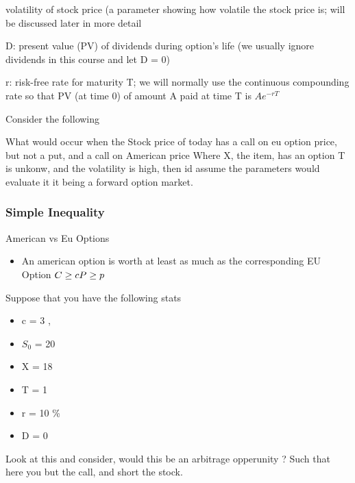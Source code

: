 \documentclass{article}
\theoremstyle{mytheoremstyle}
\theoremstyle{mytheoremstyle}
\theoremstyle{myproblemstyle}
\begin{document}
\begin{definition}[σ]
	volatility of stock price (a parameter showing how
	volatile the stock price is; will be discussed later in more
	detail
\end{definition}

\begin{definition}[D]
	D: present value (PV) of dividends during option’s life (we
	usually ignore dividends in this course and let D = 0)
\end{definition}

\begin{definition}[r]
	r: risk-free rate for maturity T; we will normally use the
	continuous compounding rate so that PV (at time 0) of
	amount A paid at time T is $Ae^{-rT}$

\end{definition}

Consider the following

What would occur when the Stock price of today has a call on eu option price, but not a put, and a call on American price
Where X, the item, has an option
T is unkonw, and the volatility is high, then id assume the parameters would evaluate it it being a forward option market.

\subsubsection{Simple Inequality}
American vs Eu Options

\begin{itemize}
	\item An american option is worth at least as much as the corresponding EU Option
	      \begin{math}
		      C \ge c
		      \\
		      P \ge p
	      \end{math}

\end{itemize}

Suppose that you have the following stats
\begin{itemize}
	\item c = 3 ,
	\item $S_0$ = 20
	\item X = 18
	\item T = 1
	\item r = 10 \%
	\item D  = 0
\end{itemize}
Look at this and consider, would this be an arbitrage opperunity ?
Such that here you but the call, and short the stock.
\end{document}
